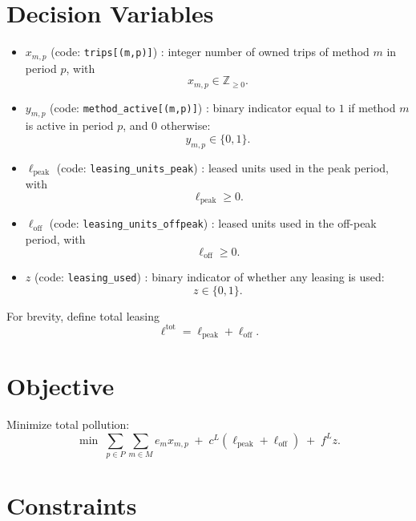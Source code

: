 \section*{Decision Variables}

\begin{itemize}
    \item $x_{m,p}$ (code: \texttt{trips[(m,p)]}) : integer number of owned trips of method $m$ in period $p$, with
    \[
    x_{m,p} \in \mathbb{Z}_{\ge 0}.
    \]
    \item $y_{m,p}$ (code: \texttt{method\_active[(m,p)]}) : binary indicator equal to $1$ if method $m$ is active in period $p$, and $0$ otherwise:
    \[
    y_{m,p} \in \{0,1\}.
    \]
    \item $\ell_{\mathrm{peak}}$ (code: \texttt{leasing\_units\_peak}) : leased units used in the peak period, with
    \[
    \ell_{\mathrm{peak}} \ge 0.
    \]
    \item $\ell_{\mathrm{off}}$ (code: \texttt{leasing\_units\_offpeak}) : leased units used in the off-peak period, with
    \[
    \ell_{\mathrm{off}} \ge 0.
    \]
    \item $z$ (code: \texttt{leasing\_used}) : binary indicator of whether any leasing is used:
    \[
    z \in \{0,1\}.
    \]
\end{itemize}

For brevity, define total leasing
\[
\ell^{\mathrm{tot}}=\ell_{\mathrm{peak}}+\ell_{\mathrm{off}}.
\]

\section*{Objective}

Minimize total pollution:
\[
\min \;
\sum_{p \in P}\sum_{m \in M} e_m x_{m,p}
\;+\;
c^{L}\left(\ell_{\mathrm{peak}}+\ell_{\mathrm{off}}\right)
\;+\;
f^{L} z.
\]

\section*{Constraints}

